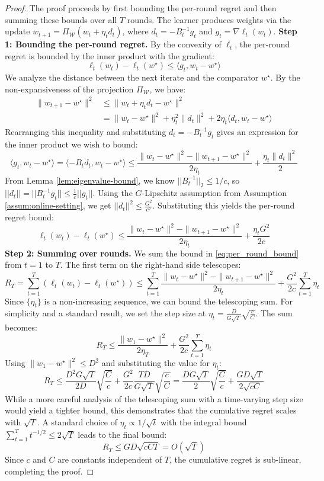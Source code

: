 \documentclass[a4paper,12pt]{article}
\begin{document}
\begin{proof}
The proof proceeds by first bounding the per-round regret and then summing these bounds over all $T$ rounds. The learner produces weights via the update $w_{t+1} = \Pi_{\mathcal{W}}(w_t + \eta_t d_t)$, where $d_t = -B_t^{-1}g_t$ and $g_t = \nabla\ell_t(w_t)$.
\textbf{Step 1: Bounding the per-round regret.}
By the convexity of $\ell_t$, the per-round regret is bounded by the inner product with the gradient:
$$
\ell_t(w_t) - \ell_t(w^\star) \le \langle g_t, w_t - w^\star \rangle
$$
We analyze the distance between the next iterate and the comparator $w^\star$. By the non-expansiveness of the projection $\Pi_{\mathcal{W}}$, we have:
\begin{align*}
    \|w_{t+1} - w^\star\|^{2} &\le \|w_t + \eta_t d_t - w^\star\|^{2} \\
    &= \|w_t - w^\star\|^{2} + \eta_t^2\|d_t\|^{2} + 2\eta_t \langle d_t, w_t - w^\star \rangle
\end{align*}
Rearranging this inequality and substituting $d_t = -B_t^{-1}g_t$ gives an expression for the inner product we wish to bound:
$$
\langle g_t, w_t - w^\star \rangle = \langle -B_t d_t, w_t - w^\star \rangle \le \frac{\|w_t - w^\star\|^{2} - \|w_{t+1} - w^\star\|^2}{2\eta_t} + \frac{\eta_t\|d_t\|^2}{2}
$$
From Lemma \ref{lem:eigenvalue-bound}, we know $||B_t^{-1}||_{2} \le 1/c$, so $||d_t|| = ||B_t^{-1}g_t|| \le \frac{1}{c}||g_t||$. Using the $G$-Lipschitz assumption from Assumption \ref{assum:online-setting}, we get $||d_t||^{2} \le \frac{G^2}{c^2}$. Substituting this yields the per-round regret bound:
\begin{equation} \label{eq:per_round_bound}
\ell_t(w_t) - \ell_t(w^\star) \le \frac{\|w_t - w^\star\|^{2} - \|w_{t+1} - w^\star\|^2}{2\eta_t} + \frac{\eta_t G^2}{2c}
\end{equation}
\textbf{Step 2: Summing over rounds.}
We sum the bound in \eqref{eq:per_round_bound} from $t=1$ to $T$. The first term on the right-hand side telescopes:
$$
R_T = \sum_{t=1}^{T} (\ell_t(w_t) - \ell_t(w^\star)) \le \sum_{t=1}^{T} \frac{\|w_t - w^\star\|^{2} - \|w_{t+1} - w^\star\|^2}{2\eta_t} + \frac{G^2}{2c}\sum_{t=1}^{T} \eta_t
$$
Since $\{\eta_t\}$ is a non-increasing sequence, we can bound the telescoping sum. For simplicity and a standard result, we set the step size at $\eta_t = \frac{D}{G\sqrt{T}}\sqrt{\frac{c}{C}}$. The sum becomes:
$$
R_T \le \frac{\|w_1 - w^\star\|^2}{2\eta_T} + \frac{G^2}{2c}\sum_{t=1}^{T} \eta_t
$$
Using $\|w_1 - w^\star\|^{2} \le D^2$ and substituting the value for $\eta_t$:
$$
R_T \le \frac{D^{2} G \sqrt{T}}{2D}\sqrt{\frac{C}{c}} + \frac{G^2}{2c} \frac{TD}{G\sqrt{T}}\sqrt{\frac{c}{C}} = \frac{DG\sqrt{T}}{2}\sqrt{\frac{C}{c}} + \frac{GD\sqrt{T}}{2\sqrt{c C}}
$$
While a more careful analysis of the telescoping sum with a time-varying step size would yield a tighter bound, this demonstrates that the cumulative regret scales with $\sqrt{T}$. A standard choice of $\eta_t \propto 1/\sqrt{t}$ with the integral bound $\sum_{t=1}^{T} t^{-1/2} \le 2\sqrt{T}$ leads to the final bound:
$$
R_T \le GD\sqrt{cCT} = O(\sqrt{T})
$$
Since $c$ and $C$ are constants independent of $T$, the cumulative regret is sub-linear, completing the proof.
\end{proof}
\end{document}

